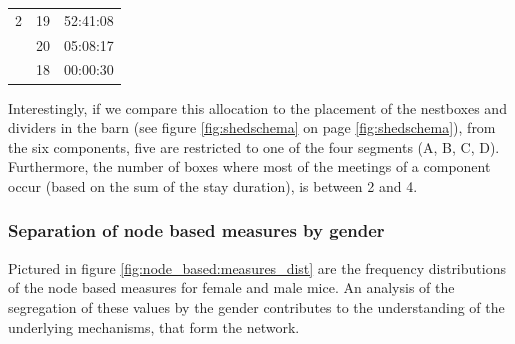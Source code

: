 \begin{table}
\begin{center}
\begin{tabular}{lll}
2	& 19	& 52:41:08 \\
	& 20	& 05:08:17 \\
	& 18	& 00:00:30 \\\hline

\end{tabular}
\label{tab:comp_box_meet_dist}
\end{center}
\end{table} 

Interestingly, if we compare this allocation to the placement of the nestboxes and dividers in the barn (see figure \ref{fig:shedschema} on page \ref{fig:shedschema}), from the six components, five are restricted to one of the four segments (A, B, C, D). Furthermore, the number of boxes where most of the meetings of a component occur (based on the sum of the stay duration), is between 2 and 4. 
 
\subsubsection{Separation of node based measures by gender}
\label{subsubsec:nbm_dist}

Pictured in figure \ref{fig:node_based:measures_dist} are the frequency distributions of the node based measures for female and male mice. An analysis of the segregation of these values by the gender contributes to the understanding of the underlying mechanisms, that form the network.

